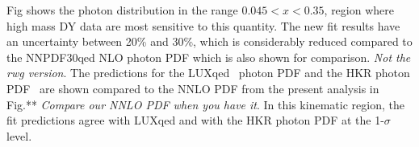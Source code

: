 Fig %
shows the photon distribution in the range $0.045 < x < 0.35$, region where high mass DY data are most 
sensitive to this quantity. The new fit results 
have an uncertainty between 20{\%} and 30{\%}, which is 
considerably reduced compared to the  NNPDF30qed NLO photon PDF which is also 
shown for comparison. {\it Not the rwg version}.
The predictions for the LUXqed~\cite{luxqed} photon PDF and the 
HKR photon PDF~\cite{hkr}  are shown compared to the NNLO PDF from the present analysis in Fig.** {\it Compare our NNLO PDF when you have it}.
In this kinematic region, the fit
 predictions agree with LUXqed and with the HKR photon PDF at the 1-$\sigma$ level. 






